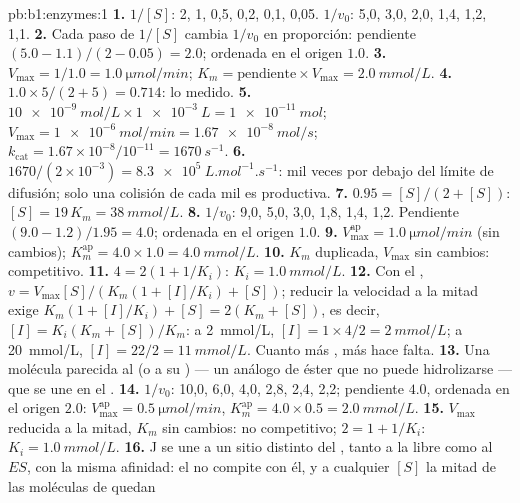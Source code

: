 \begin{solution}{pb:b1:enzymes:1}
\textbf{1.} $1/[S]$: 2, 1, 0,5, 0,2, 0,1, 0,05. $1/v_0$: 5,0, 3,0, 2,0,
1,4, 1,2, 1,1.
\textbf{2.} Cada paso de $1/[S]$ cambia $1/v_0$ en proporción: pendiente
$(5.0 - 1.1)/(2 - 0.05) = 2.0$; ordenada en el origen $1.0$.
\textbf{3.} $V_{\max} = 1/1.0 = \qty{1.0}{\micro mol/min}$; $K_m =
\text{pendiente}\times V_{\max} = \qty{2.0}{mmol/L}$.
\textbf{4.} $1.0\times 5/(2 + 5) = 0.714$: lo medido.
\textbf{5.} $\qty{10e-9}{mol/L}\times\qty{1e-3}{L} = \qty{1e-11}{mol}$;
$V_{\max} = \qty{1e-6}{mol/min} = \qty{1.67e-8}{mol/s}$;
$k_{\text{cat}} = 1.67\times 10^{-8}/10^{-11} = \qty{1670}{s^{-1}}$.
\textbf{6.} $1670/(2\times 10^{-3}) = \qty{8.3e5}{L.mol^{-1}.s^{-1}}$: mil
veces por debajo del límite de difusión; solo una colisión de cada mil es
productiva.
\textbf{7.} $0.95 = [S]/(2 + [S])$: $[S] = 19\,K_m = \qty{38}{mmol/L}$.
\textbf{8.} $1/v_0$: 9,0, 5,0, 3,0, 1,8, 1,4, 1,2. Pendiente $(9.0 -
1.2)/1.95 = 4.0$; ordenada en el origen $1.0$.
\textbf{9.} $V_{\max}^{\text{ap}} = \qty{1.0}{\micro mol/min}$ (sin
cambios); $K_m^{\text{ap}} = 4.0\times 1.0 = \qty{4.0}{mmol/L}$.
\textbf{10.} $K_m$ duplicada, $V_{\max}$ sin cambios: competitivo.
\textbf{11.} $4 = 2(1 + 1/K_i)$: $K_i = \qty{1.0}{mmol/L}$.
\textbf{12.} Con el , $v = V_{\max}[S]/(K_m(1 + [I]/K_i) +
[S])$;
reducir la velocidad a la mitad exige $K_m(1 + [I]/K_i) + [S] = 2(K_m +
[S])$, es decir, $[I] = K_i(K_m + [S])/K_m$: a \qty{2}{mmol/L}, $[I] =
1\times 4/2 = \qty{2}{mmol/L}$; a \qty{20}{mmol/L}, $[I] = 22/2 =
\qty{11}{mmol/L}$. Cuanto más , más  hace falta.
\textbf{13.} Una molécula parecida al  (o a su ) --- un análogo de éster que no puede hidrolizarse --- que se
une en el .
\textbf{14.} $1/v_0$: 10,0, 6,0, 4,0, 2,8, 2,4, 2,2; pendiente $4.0$,
ordenada en el origen $2.0$: $V_{\max}^{\text{ap}} = \qty{0.5}{\micro mol/min}$,
$K_m^{\text{ap}} = 4.0\times 0.5 = \qty{2.0}{mmol/L}$.
\textbf{15.} $V_{\max}$ reducida a la mitad, $K_m$ sin cambios: no
competitivo; $2 = 1 + 1/K_i$: $K_i = \qty{1.0}{mmol/L}$.
\textbf{16.} J se une a un sitio distinto del , tanto a la
 libre como al $ES$, con la misma afinidad: el  no compite con
él, y a cualquier $[S]$ la mitad de las moléculas de  quedan

\end{solution}

